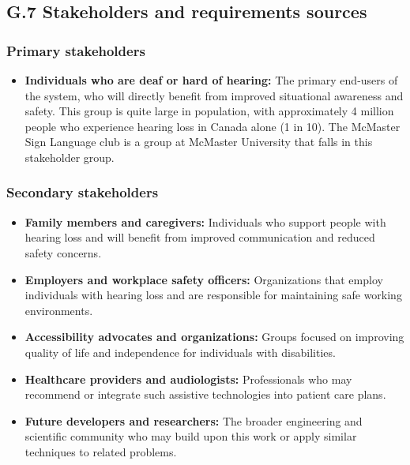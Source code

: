 \documentclass[12pt]{article}
\theoremstyle{definition}
\begin{document}
\subsection{G.7 Stakeholders and requirements sources}

\subsubsection{Primary stakeholders}

\begin{itemize}
\item \textbf{Individuals who are deaf or hard of hearing:}
\label{stakeholder:hardHearing} The primary end-users of the system, who will
directly benefit from improved situational awareness and safety. This group is
quite large in population, with approximately 4 million people who experience
hearing loss in Canada alone (1 in 10). The McMaster Sign Language club is a
group at McMaster University that falls in this stakeholder group.

\end{itemize}

\subsubsection{Secondary stakeholders}

\begin{itemize}
\item \textbf{Family members and caregivers:} Individuals who support people
with hearing loss and will benefit from improved communication and reduced
safety concerns.

\item \textbf{Employers and workplace safety officers:} Organizations that
employ individuals with hearing loss and are responsible for maintaining safe
working environments.

\item \textbf{Accessibility advocates and organizations:} Groups focused on
improving quality of life and independence for individuals with disabilities.

\item \textbf{Healthcare providers and audiologists:} Professionals who may
recommend or integrate such assistive technologies into patient care plans.

\item \textbf{Future developers and researchers:} The broader engineering and
scientific community who may build upon this work or apply similar techniques to
related problems.
\end{itemize}
\end{document}
